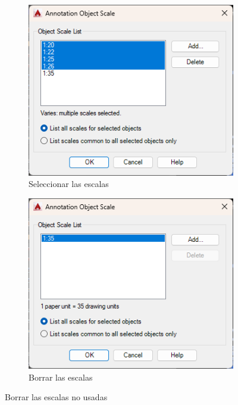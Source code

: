 \documentclass[12pt,letterpaper,final]{report}
\begin{document}
\begin{figure}[H]
	\centering
	\begin{subfigure}[b]{0.45\textwidth}
		\includegraphics[width=\textwidth]{Imagenes/apendice_anotative_06}
		\caption{Seleccionar las escalas}
		\label{fig:apendiceanotative06}
	\end{subfigure}
	\begin{subfigure}[b]{0.45\textwidth}
		\includegraphics[width=\textwidth]{Imagenes/apendice_anotative_07}
		\caption{Borrar las escalas}
		\label{fig:apendiceanotative07}
	\end{subfigure}
	\caption{Borrar las escalas no usadas}
\end{figure}
\end{document}

